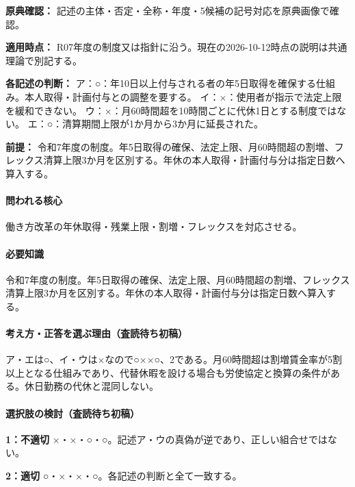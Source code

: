 \noindent\textbf{原典確認：} 記述の主体・否定・全称・年度・5候補の記号対応を原典画像で確認。\par

\noindent\textbf{適用時点：} R07年度の制度又は指針に沿う。現在の2026-10-12時点の説明は共通理論で別記する。\par

\noindent\textbf{各記述の判断：} ア：○：年10日以上付与される者の年5日取得を確保する仕組み。本人取得・計画付与との調整を要する。 イ：×：使用者が指示で法定上限を緩和できない。 ウ：×：月60時間超を10時間ごとに代休1日とする制度ではない。 エ：○：清算期間上限が1か月から3か月に延長された。\par

\noindent\textbf{前提：} 令和7年度の制度。年5日取得の確保、法定上限、月60時間超の割増、フレックス清算上限3か月を区別する。年休の本人取得・計画付与分は指定日数へ算入する。\par

\paragraph{問われる核心} 働き方改革の年休取得・残業上限・割増・フレックスを対応させる。

\paragraph{必要知識} 令和7年度の制度。年5日取得の確保、法定上限、月60時間超の割増、フレックス清算上限3か月を区別する。年休の本人取得・計画付与分は指定日数へ算入する。

\paragraph{考え方・正答を選ぶ理由（査読待ち初稿）} ア・エは○、イ・ウは×なので○××○、2である。月60時間超は割増賃金率が5割以上となる仕組みであり、代替休暇を設ける場合も労使協定と換算の条件がある。休日勤務の代休と混同しない。

\paragraph{選択肢の検討（査読待ち初稿）}\mbox{}\par

\noindent\textbf{1：不適切} ×・×・○・○。記述ア・ウの真偽が逆であり、正しい組合せではない。\par

\noindent\textbf{2：適切} ○・×・×・○。各記述の判断と全て一致する。\par

